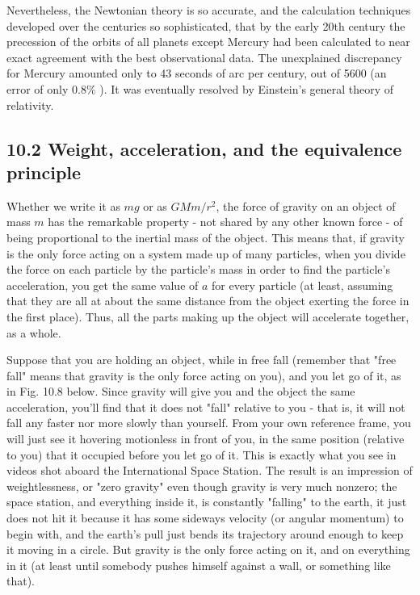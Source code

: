 \documentclass[10pt]{article}
\begin{document}
Nevertheless, the Newtonian theory is so accurate, and the calculation techniques developed over the centuries so sophisticated, that by the early 20th century the precession of the orbits of all planets except Mercury had been calculated to near exact agreement with the best observational data. The unexplained discrepancy for Mercury amounted only to 43 seconds of arc per century, out of 5600 (an error of only $0.8 \%$ ). It was eventually resolved by Einstein's general theory of relativity.

\subsection*{10.2 Weight, acceleration, and the equivalence principle}
Whether we write it as $m g$ or as $G M m / r^{2}$, the force of gravity on an object of mass $m$ has the remarkable property - not shared by any other known force - of being proportional to the inertial mass of the object. This means that, if gravity is the only force acting on a system made up of many particles, when you divide the force on each particle by the particle's mass in order to find the particle's acceleration, you get the same value of $a$ for every particle (at least, assuming that they are all at about the same distance from the object exerting the force in the first place). Thus, all the parts making up the object will accelerate together, as a whole.

Suppose that you are holding an object, while in free fall (remember that "free fall" means that gravity is the only force acting on you), and you let go of it, as in Fig. 10.8 below. Since gravity will give you and the object the same acceleration, you'll find that it does not "fall" relative to you - that is, it will not fall any faster nor more slowly than yourself. From your own reference frame, you will just see it hovering motionless in front of you, in the same position (relative to you) that it occupied before you let go of it. This is exactly what you see in videos shot aboard the International Space Station. The result is an impression of weightlessness, or "zero gravity" even though gravity is very much nonzero; the space station, and everything inside it, is constantly "falling" to the earth, it just does not hit it because it has some sideways velocity (or angular momentum) to begin with, and the earth's pull just bends its trajectory around enough to keep it moving in a circle. But gravity is the only force acting on it, and on everything in it (at least until somebody pushes himself against a wall, or something like that).
\end{document}
